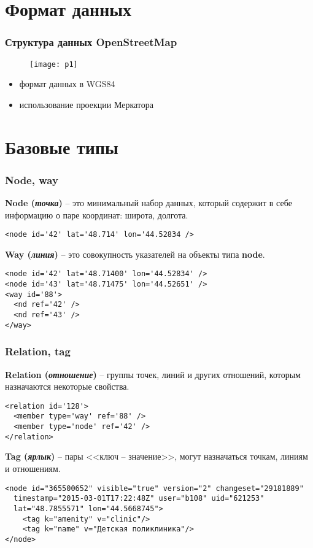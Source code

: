 \section{Формат данных}
\begin{frame}
    \frametitle{Структура данных OpenStreetMap}
    \begin{figure}[ht!]
        \center
        \texttt{[image: p1]}
    \end{figure}
    \scriptsize
    \begin{itemize}
        \item формат данных в WGS84
        \item использование проекции Меркатора\footnotemark
    \end{itemize}
    \normalsize
\end{frame}

\section{Базовые типы}
\begin{frame}[fragile]
    \frametitle{Node, way}
    \textbf{Node (\emph{точка})} -- это минимальный набор данных, который содержит в себе 
    информацию о паре координат: широта, долгота.
    \begin{lstlisting}
<node id='42' lat='48.714' lon='44.52834 />
    \end{lstlisting}
    \textbf{Way (\emph{линия})} -- это совокупность указателей на объекты типа \textbf{node}.
    \begin{lstlisting}
<node id='42' lat='48.71400' lon='44.52834' />
<node id='43' lat='48.71475' lon='44.52651' />
<way id='88'>
  <nd ref='42' />
  <nd ref='43' />
</way>
    \end{lstlisting}
\end{frame}

\begin{frame}[fragile]
    \frametitle{Relation, tag}
    \textbf{Relation (\emph{отношение})} -- группы точек, линий и других отношений, которым 
    назначаются некоторые свойства.
    \begin{lstlisting}
<relation id='128'>
  <member type='way' ref='88' />
  <member type='node' ref='42' />
</relation>
    \end{lstlisting}
    \textbf{Tag (\emph{ярлык})} -- пары <<ключ -- значение>>, могут назначаться точкам, 
    линиям и отношениям.
    \begin{lstlisting}
<node id="365500652" visible="true" version="2" changeset="29181889"
  timestamp="2015-03-01T17:22:48Z" user="b108" uid="621253"
  lat="48.7855571" lon="44.5668745">
    <tag k="amenity" v="clinic"/>
    <tag k="name" v="Детская поликлиника"/>
</node>
    \end{lstlisting}
\end{frame}

